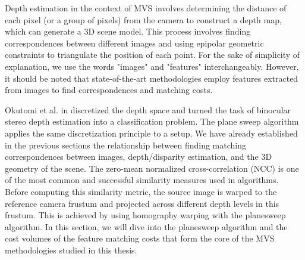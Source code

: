 Depth estimation in the context of MVS involves determining the distance of each pixel (or a group of pixels) from the camera to construct a depth map, which can generate a 3D scene model. This process involves finding correspondences between different images and using epipolar geometric constraints to triangulate the position of each point. For the sake of simplicity of explanation, we use the words "images" and "features" interchangeably. However, it should be noted that state-of-the-art {\mvs} methodologies employ features extracted from images to find correspondences and matching costs. 

Okutomi et al. in \cite{Okutomi1993} discretized the depth space and turned the task of binocular stereo depth estimation into a classification problem. The plane sweep algorithm \cite{Collins1996ASA} applies the same discretization principle to a {\mvs} setup. We have already established in the previous sections the relationship between finding matching correspondences between images, depth/disparity estimation, and the 3D geometry of the scene. The zero-mean normalized cross-correlation (NCC) is one of the most common and successful similarity measures used in {\mvs} algorithms. Before computing this similarity metric, the source image is warped to the reference camera frustum and projected across different depth levels in this frustum. This is achieved by using homography warping with the planesweep algorithm. In this section, we will dive into the planesweep algorithm and the cost volumes of the feature matching costs that form the core of the MVS methodologies studied in this thesis. 

